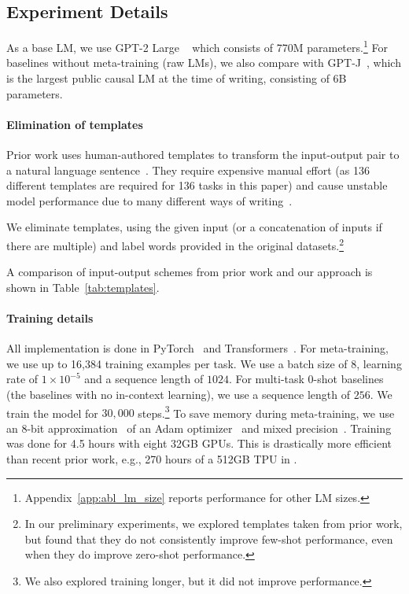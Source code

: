 \subsection{Experiment Details}\label{subsec:impl-details}
As a base LM, we use GPT-2 Large ~\citep{radford2019language} which consists of 770M parameters.\footnote{Appendix~\ref{app:abl_lm_size} reports performance for other LM sizes.} For baselines without meta-training (raw LMs), we also compare with GPT-J~\citep{wang2021gpt}, which is the largest public causal LM at the time of writing, consisting of 6B parameters.

\paragraph{Elimination of templates} Prior work uses human-authored templates to transform the input-output pair to a natural language sentence~\citep{zhong2021adapting,mishra2022cross,wei2022finetuned,chen2022meta}. They require expensive manual effort (as 136 different templates are required for 136 tasks in this paper) and cause unstable model performance due to many different ways of writing~\citep{mishra2021reframing}.

We eliminate templates, using the given input (or a concatenation of inputs if there are multiple) and label words provided in the original datasets.\footnote{In our preliminary experiments, we explored templates taken from prior work, but found that they do not consistently improve few-shot performance, even when they do improve zero-shot performance.}

A comparison of input-output schemes from prior work and our approach is shown in Table~\ref{tab:templates}.

\paragraph{Training details} All implementation is done in PyTorch~\citep{paszke2019pytorch} and Transformers~\citep{wolf-etal-2020-transformers}. For meta-training, we use up to 16,384 training examples per task. We use a batch size of $8$, learning rate of $1 \times 10^{-5}$ and a sequence length of $1024$. For multi-task 0-shot baselines (the baselines with no in-context learning), we use a sequence length of $256$. We train the model for $30,000$ steps.\footnote{We also explored training longer, but it did not improve performance.} To save memory during meta-training, we use an 8-bit approximation~\citep{dettmers20228} of an Adam optimizer~\citep{kingma2015adam} and mixed precision~\citep{micikevicius2017mixed}. Training was done for 4.5 hours with eight 32GB GPUs. This is drastically more efficient than recent prior work, e.g., 270 hours of a 512GB TPU in \citet{sanh2022multitask}.


